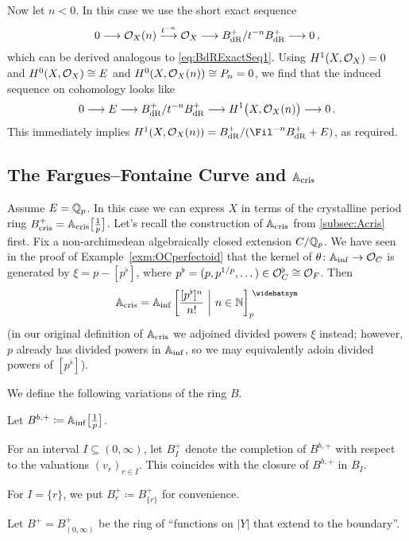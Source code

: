 \documentclass[a4paper, 10pt, oneside, DIV=9, chapterprefix=true, numbers=enddot,bibliography=totoc]{scrbook}
\begin{document}
\begin{proof*}
	Now let $n<0$. In this case we use the short exact sequence
	\begin{equation}\label{eq:BdRExactSeq3}
		0\morphism \Oo_X(n)\morphism[t^{-n}]\Oo_X\morphism B_\dR^+/t^{-n}B_\dR^+\morphism 0\,,
	\end{equation}
	which can be derived analogous to \cref{eq:BdRExactSeq1}. Using $H^1(X,\mathcal{O}_X)=0$ and $H^0(X,\mathcal{O}_X)\cong E$ and $H^0(X,\mathcal{O}_X(n))\cong P_n=0$, we find that the induced sequence on cohomology looks like
	\begin{equation*}
		0\morphism E\morphism B_\dR^+/t^{-n}B_\dR^+\morphism H^1\big(X,\Oo_X(n)\big)\morphism 0\,.
	\end{equation*}
	This immediately implies $H^1(X,\Oo_X(n))=B_\dR^+/(\Fil^{-n}B_\dR^++E)$, as required.
\end{proof*}
\subsection{The Fargues--Fontaine Curve and \texorpdfstring{$\mathbb{A}_{\mathrm{cris}}$}{Acris}}
Assume $E=\mathbb{Q}_p$. In this case we can express $X$ in terms of the crystalline period ring $B_{\mathrm{cris}}^+=\mathbb{A}_{\mathrm{cris}}\big[\textstyle\frac{1}{p}\big]$. Let's recall the construction of $\mathbb{A}_{\mathrm{cris}}$ from \cref{subsec:Acris} first. Fix a non-archimedean algebraically closed extension $C/\mathbb{Q}_p$. We have seen in the proof of Example~\cref{exm:OCperfectoid} that the kernel of $\theta\colon\IA_\inf\morphism \Oo_C$ is generated by $\xi=p-[p^\flat]$, where $p^\flat=(p,p^{1/p},\dotsc)\in \mathcal{O}_C^\flat\cong \mathcal{O}_F$. Then
\begin{equation*}
	\IA_\cris=\IA_\inf\left[\frac{[p^\flat]^n}{n!}\st n\in\IN\right]_p^\complete
\end{equation*}
(in our original definition of $\mathbb{A}_{\mathrm{cris}}$ we adjoined divided powers $\xi$ instead; however, $p$ already has divided powers in $\mathbb{A}_{\mathrm{inf}}$, so we may equivalently adoin divided powers of $[p^\flat]$).
\begin{defi}\label{def:Bb+}
	We define the following variations of the ring $B$.
	\begin{numerate}
		\item Let $B^{b,+}\coloneqq \mathbb{A}_{\mathrm{inf}}\big[\textstyle\frac{1}{p}\big]$.
		\item For an interval $I\subseteq (0,\infty)$, let $B_I^+$ denote the completion of $B^{b,+}$ with respect to the valuations $(v_r)_{r\in I}$. This coincides with the closure of $B^{b,+}$ in $B_I$.
		\item For $I=\{r\}$, we put $B_r^+\coloneqq B_{\{r\}}^+$ for convenience.
		\item Let $B^+=B_{(0,\infty)}^+$ be the ring of \enquote{functions on $|Y|$ that extend to the boundary}.
	\end{numerate}
\end{defi}
\end{document}

